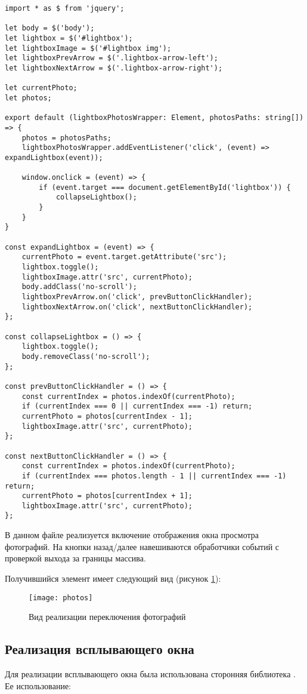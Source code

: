 \documentclass[a4paper,14pt]{extarticle}
\begin{document}
\begin{lstlisting}
import * as $ from 'jquery';

let body = $('body');
let lightbox = $('#lightbox');
let lightboxImage = $('#lightbox img');
let lightboxPrevArrow = $('.lightbox-arrow-left');
let lightboxNextArrow = $('.lightbox-arrow-right');

let currentPhoto;
let photos;

export default (lightboxPhotosWrapper: Element, photosPaths: string[]) => {
    photos = photosPaths;
    lightboxPhotosWrapper.addEventListener('click', (event) => expandLightbox(event));

    window.onclick = (event) => {
        if (event.target === document.getElementById('lightbox')) {
            collapseLightbox();
        }
    }
}

const expandLightbox = (event) => {
    currentPhoto = event.target.getAttribute('src');
    lightbox.toggle();
    lightboxImage.attr('src', currentPhoto);
    body.addClass('no-scroll');
    lightboxPrevArrow.on('click', prevButtonClickHandler);
    lightboxNextArrow.on('click', nextButtonClickHandler);
};

const collapseLightbox = () => {
    lightbox.toggle();
    body.removeClass('no-scroll');
};

const prevButtonClickHandler = () => {
    const currentIndex = photos.indexOf(currentPhoto);
    if (currentIndex === 0 || currentIndex === -1) return;
    currentPhoto = photos[currentIndex - 1];
    lightboxImage.attr('src', currentPhoto);
};

const nextButtonClickHandler = () => {
    const currentIndex = photos.indexOf(currentPhoto);
    if (currentIndex === photos.length - 1 || currentIndex === -1) return;
    currentPhoto = photos[currentIndex + 1];
    lightboxImage.attr('src', currentPhoto);
};
\end{lstlisting}

В данном файле реализуется включение отображения окна просмотра фотографий. На кнопки назад/далее
навешиваются обработчики событий с проверкой выхода за границы массива.

Получившийся элемент имеет следующий вид (рисунок \ref{fig:photos}):
\begin{figure}[H]
    \centering
    \texttt{[image: photos]}
    \caption{Вид реализации переключения фотографий}
    \label{fig:photos}
\end{figure}

\subsection{Реализация всплывающего окна}
Для реализации всплывающего окна была использована сторонняя библиотека
. Ее использование:
\end{document}
